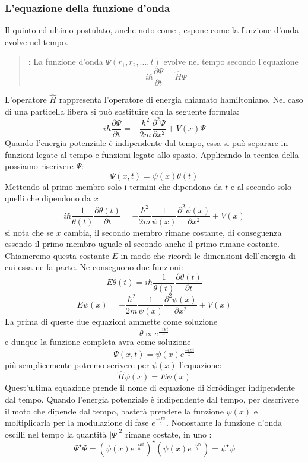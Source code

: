 \subsubsection{L'equazione della funzione d'onda}
Il quinto ed ultimo postulato, anche noto come , espone come la funzione d'onda evolve nel tempo.
\begin{quote}
  : La funzione d'onda $\Psi(r_1, r_2, ..., t)$ evolve nel tempo secondo l'equazione
  $$i\hbar \frac{\partial \Psi}{\partial t} = \hat{H} \Psi$$
\end{quote}
L'operatore $\hat{H}$ rappresenta l'operatore di energia chiamato hamiltoniano. Nel caso di una particella libera si può sostituire con la seguente formula:
$$i \hbar \frac{\partial \Psi}{\partial t} = - \frac{\hbar^2}{2 m} \frac{\partial^2 \Psi}{\partial x^2} + V(x) \Psi$$
Quando l'energia potenziale è indipendente dal tempo, essa si può separare in funzioni legate al tempo e funzioni legate allo spazio. Applicando la tecnica della  possiamo riscrivere $\Psi$:
$$\Psi(x, t) = \psi(x) \theta(t)$$
Mettendo al primo membro solo i termini che dipendono da $t$ e al secondo solo quelli che dipendono da $x$
$$i \hbar \frac{1}{\theta(t)} \frac{\partial \theta(t)}{\partial t} = - \frac{\hbar^2}{2 m} \frac{1}{\psi(x)} \frac{\partial^2 \psi(x)}{\partial x^2} + V(x)$$
si nota che se $x$ cambia, il secondo membro rimane costante, di conseguenza essendo il primo membro uguale al secondo anche il primo rimane costante. Chiameremo questa costante $E$ in modo che ricordi le dimensioni dell'energia di cui essa ne fa parte. Ne conseguono due funzioni:
$$E \theta(t) = i \hbar \frac{1}{\theta(t)} \frac{\partial \theta(t)}{\partial t}$$
$$E \psi(x) = - \frac{\hbar^2}{2 m} \frac{1}{\psi(x)} \frac{\partial^2 \psi(x)}{\partial x^2} + V(x)$$
La prima di queste due equazioni ammette come soluzione
$$\theta \propto e^{\frac{-i E t}{\hbar}}$$
e dunque la funzione completa avra come soluzione
$$\Psi(x, t) = \psi(x) e^{\frac{-i E t}{\hbar}}$$
più semplicemente potremo scrivere per $\psi(x)$ l'equazione:
$$\hat{H} \psi(x) = E \psi(x)$$
Quest'ultima equazione prende il nome di equazione di Scr\"odinger indipendente dal tempo.
Quando l'energia potenziale è indipendente dal tempo, per descrivere il moto che dipende dal tempo, basterà prendere la funzione $\psi(x)$ e moltiplicarla per la modulazione di fase $e^{\frac{-i E t}{\hbar}}$. Nonostante la funzione d'onda oscilli nel tempo la quantità ${\left|\Psi\right|}^2$ rimane costate, in uno :
$$\Psi^{\star} \Psi = {\left(\psi(x) e^{\frac{-i E t}{\hbar}}\right)}^{\star} \left(\psi(x) e^{\frac{-i E t}{\hbar}}\right) = \psi^{\star} \psi$$
